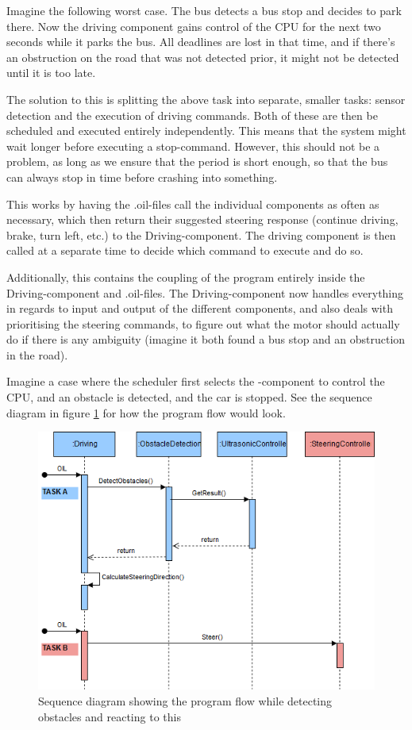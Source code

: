 Imagine the following worst case. The bus detects a bus stop and decides to park there. Now the driving component gains control of the CPU for the next two seconds while it parks the bus. All deadlines are lost in that time, and if there's an obstruction on the road that was not detected prior, it might not be detected until it is too late. 

The solution to this is splitting the above task into separate, smaller tasks: sensor detection and the execution of driving commands. Both of these are then be scheduled and executed entirely independently. This means that the system might wait longer before executing a stop-command. However, this should not be a problem, as long as we ensure that the period is short enough, so that the bus can always stop in time before crashing into something. 

This works by having the .oil-files call the individual components as often as necessary, which then return their suggested steering response (continue driving, brake, turn left, etc.) to the Driving-component. The driving component is then called at a separate time to decide which command to execute and do so.

Additionally, this contains the coupling of the program entirely inside the Driving-component and .oil-files. The Driving-component now handles everything in regards to input and output of the different components, and also deals with prioritising the steering commands, to figure out what the motor should actually do if there is any ambiguity (imagine it both found a bus stop and an obstruction in the road). 

Imagine a case where the scheduler first selects the -component to control the CPU, and an obstacle is detected, and the car is stopped. See the sequence diagram in figure \ref{fig:sequenceDetectObstacle} for how the program flow would look.

\begin{figure}[ht]
    \includegraphics[width=\textwidth]{Images/Design/sequenceObstacleDetection.png}
    \caption{Sequence diagram showing the program flow while detecting obstacles and reacting to this}
    \label{fig:sequenceDetectObstacle}
\end{figure}


